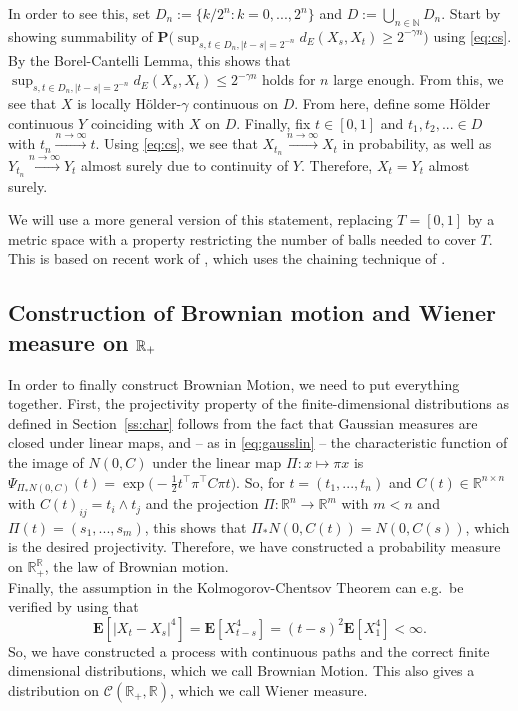 \documentclass[lean]{Draft}
\begin{document}
In order to see this, set $D_n := \{k/2^n: k=0,...,2^n\}$ and $D := \bigcup_{n\in\mathbb N} D_n$. Start by showing summability of $\mathbf P\Big( \sup_{s,t\in D_n, |t-s| = 2^{-n}} d_E(X_s, X_t) \geq 2^{-\gamma n} \Big)$ using \eqref{eq:cs}.
By the Borel-Cantelli Lemma, this shows that $\sup_{s,t\in D_n, |t-s| = 2^{-n}} d_E(X_s, X_t) \leq 2^{-\gamma n}$ holds for $n$ large enough.
From this, we see that $X$ is locally Hölder-$\gamma$ continuous on $D$.
From here, define some Hölder continuous $Y$ coinciding with $X$ on $D$.
Finally, fix $t \in [0,1]$ and $t_1, t_2,...\in D$ with $t_n \xrightarrow{n\to\infty} t$.
Using \eqref{eq:cs}, we see that $X_{t_n} \xrightarrow{n\to\infty} X_t$ in probability, as well as $Y_{t_n} \xrightarrow{n\to\infty} Y_t$ almost surely due to continuity of $Y$.
Therefore, $X_t = Y_t$ almost surely.

We will use a more general version of this statement, replacing $T = [0,1]$ by a metric space with a property restricting the number of balls needed to cover $T$. This is based on recent work of \cite{kratschmer2023kolmogorov}, which uses the chaining technique of \cite{talagrand2014}.



\subsection{Construction of Brownian motion and Wiener measure on $\mathbb{R}_+$}

In order to finally construct Brownian Motion, we need to put everything together. First, the projectivity property of the finite-dimensional distributions as defined in Section~\ref{ss:char} follows from the fact that Gaussian measures are closed under linear maps, and -- as in \eqref{eq:gausslin} -- the characteristic function of the image of $N(0,C)$ under the linear map $\Pi : x \mapsto \pi x$ is $\Psi_{\Pi_\ast N(0,C)}(t) = \exp\Big( -\tfrac 12 t^\top \pi^\top C \pi t \Big)$. So, for $t = (t_1,...,t_n)$ and $C(t) \in \mathbb R^{n\times n}$ with $C(t)_{ij} = t_i \wedge t_j$ and the projection $\Pi: \mathbb R^n \to \mathbb R^m$ with $m < n$ and $\Pi(t) = (s_1,...,s_m)$, this shows that $\Pi_\ast N(0,C(t)) = N(0,C(s))$, which is the desired projectivity. Therefore, we have constructed a probability measure on $\mathbb R_+^{\mathbb R}$, the law of Brownian motion.\\
Finally, the assumption in the Kolmogorov-Chentsov Theorem can e.g.\ be verified by using that
\[ \mathbf E[|X_t - X_s|^4] = \mathbf E[X_{t-s}^4] = (t-s)^2 \mathbf E[X_{1}^4] < \infty.\]
So, we have constructed a process with continuous paths and the correct finite dimensional distributions, which we call Brownian Motion.
This also gives a distribution on $\mathcal C(\mathbb R_+, \mathbb R)$, which we call Wiener measure.
\end{document}
